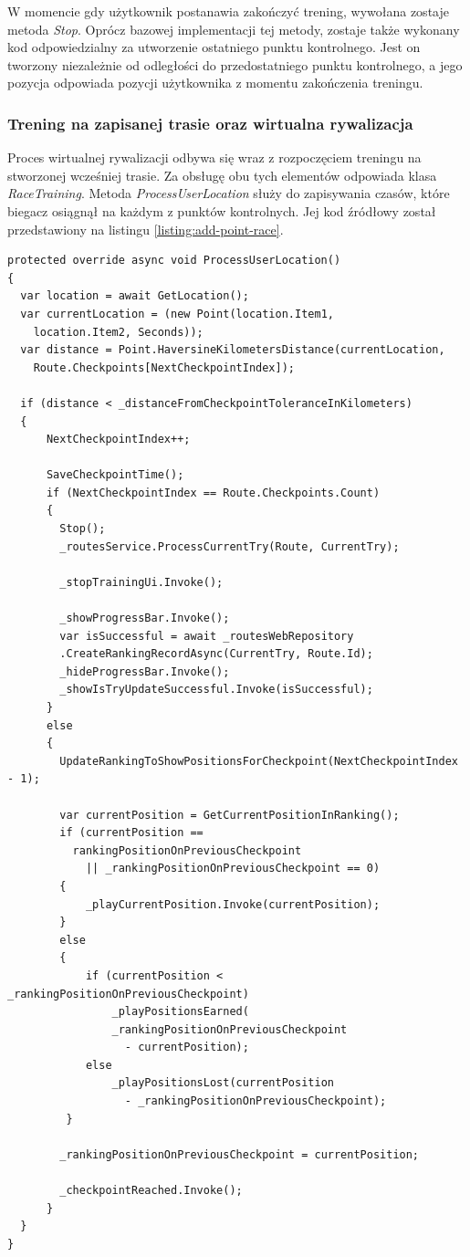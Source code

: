 W momencie gdy użytkownik postanawia zakończyć trening, wywołana zostaje metoda \textit{Stop}. Oprócz bazowej implementacji tej metody, zostaje także wykonany kod odpowiedzialny za utworzenie ostatniego punktu kontrolnego. Jest on tworzony niezależnie od odległości do przedostatniego punktu kontrolnego, a jego pozycja odpowiada pozycji użytkownika z momentu zakończenia treningu.

\subsubsection{Trening na zapisanej trasie oraz wirtualna rywalizacja}
Proces wirtualnej rywalizacji odbywa się wraz z rozpoczęciem treningu na stworzonej wcześniej trasie. Za obsługę obu tych elementów odpowiada klasa \textit{RaceTraining}. Metoda \textit{ProcessUserLocation} służy do zapisywania czasów, które biegacz osiągnął na każdym z punktów kontrolnych. Jej kod źródłowy został przedstawiony na listingu \ref{listing:add-point-race}.
\begin{lstlisting}[caption={Proces wirtualnej rywalizacji},label=listing:add-point-race]
protected override async void ProcessUserLocation()
{
  var location = await GetLocation();
  var currentLocation = (new Point(location.Item1,
    location.Item2, Seconds));
  var distance = Point.HaversineKilometersDistance(currentLocation,
    Route.Checkpoints[NextCheckpointIndex]);

  if (distance < _distanceFromCheckpointToleranceInKilometers)
  {
      NextCheckpointIndex++;

      SaveCheckpointTime();
      if (NextCheckpointIndex == Route.Checkpoints.Count)
      {
        Stop();
        _routesService.ProcessCurrentTry(Route, CurrentTry);

        _stopTrainingUi.Invoke();

        _showProgressBar.Invoke();
        var isSuccessful = await _routesWebRepository
		.CreateRankingRecordAsync(CurrentTry, Route.Id);
        _hideProgressBar.Invoke();
        _showIsTryUpdateSuccessful.Invoke(isSuccessful);
      }
      else
      {
        UpdateRankingToShowPositionsForCheckpoint(NextCheckpointIndex - 1);

        var currentPosition = GetCurrentPositionInRanking();
        if (currentPosition == 
          rankingPositionOnPreviousCheckpoint
            || _rankingPositionOnPreviousCheckpoint == 0)
        {
            _playCurrentPosition.Invoke(currentPosition);
        }
        else
        {
            if (currentPosition < _rankingPositionOnPreviousCheckpoint)
                _playPositionsEarned(
                _rankingPositionOnPreviousCheckpoint
                  - currentPosition);
            else
                _playPositionsLost(currentPosition
                  - _rankingPositionOnPreviousCheckpoint);
         }

        _rankingPositionOnPreviousCheckpoint = currentPosition;

        _checkpointReached.Invoke();
      }
  }
}
\end{lstlisting}
